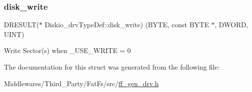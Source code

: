 \subsubsection{\texorpdfstring{disk\_write}{disk\_write}}
{\footnotesize\ttfamily D\+R\+E\+S\+U\+LT($\ast$ Diskio\+\_\+drv\+Type\+Def\+::disk\+\_\+write) (B\+Y\+TE, const B\+Y\+TE $\ast$, D\+W\+O\+RD, U\+I\+NT)}

Write Sector(s) when \+\_\+\+U\+S\+E\+\_\+\+W\+R\+I\+TE = 0 

The documentation for this struct was generated from the following file\+:\begin{DoxyCompactItemize}
\item 
Middlewares/\+Third\+\_\+\+Party/\+Fat\+Fs/src/\mbox{\hyperlink{ff__gen__drv_8h}{ff\+\_\+gen\+\_\+drv.\+h}}\end{DoxyCompactItemize}
